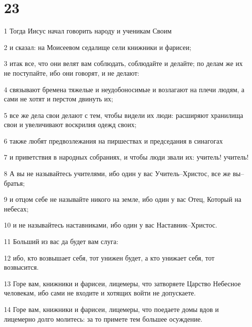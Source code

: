 \chapter{23}

\par 1 Тогда Иисус начал говорить народу и ученикам Своим
\par 2 и сказал: на Моисеевом седалище сели книжники и фарисеи;
\par 3 итак все, что они велят вам соблюдать, соблюдайте и делайте; по делам же их не поступайте, ибо они говорят, и не делают:
\par 4 связывают бремена тяжелые и неудобоносимые и возлагают на плечи людям, а сами не хотят и перстом двинуть их;
\par 5 все же дела свои делают с тем, чтобы видели их люди: расширяют хранилища свои и увеличивают воскрилия одежд своих;
\par 6 также любят предвозлежания на пиршествах и председания в синагогах
\par 7 и приветствия в народных собраниях, и чтобы люди звали их: учитель! учитель!
\par 8 А вы не называйтесь учителями, ибо один у вас Учитель--Христос, все же вы--братья;
\par 9 и отцом себе не называйте никого на земле, ибо один у вас Отец, Который на небесах;
\par 10 и не называйтесь наставниками, ибо один у вас Наставник--Христос.
\par 11 Больший из вас да будет вам слуга:
\par 12 ибо, кто возвышает себя, тот унижен будет, а кто унижает себя, тот возвысится.
\par 13 Горе вам, книжники и фарисеи, лицемеры, что затворяете Царство Небесное человекам, ибо сами не входите и хотящих войти не допускаете.
\par 14 Горе вам, книжники и фарисеи, лицемеры, что поедаете домы вдов и лицемерно долго молитесь: за то примете тем большее осуждение.
\par 15 Горе вам, книжники и фарисеи, лицемеры, что обходите море и сушу, дабы обратить хотя одного; и когда это случится, делаете его сыном геенны, вдвое худшим вас.
\par 16 Горе вам, вожди слепые, которые говорите: если кто поклянется храмом, то ничего, а если кто поклянется золотом храма, то повинен.
\par 17 Безумные и слепые! что больше: золото, или храм, освящающий золото?
\par 18 Также: если кто поклянется жертвенником, то ничего, если же кто поклянется даром, который на нем, то повинен.

